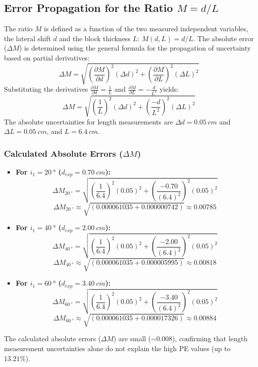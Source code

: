 \documentclass[12pt, a4paper]{article}
\begin{document}
\subsection{Error Propagation for the Ratio $M = d/L$}
The ratio $M$ is defined as a function of the two measured independent variables, the lateral shift $d$ and the block thickness $L$: $M(d,L) = d/L$. The absolute error ($\Delta M$) is determined using the general formula for the propagation of uncertainty based on partial derivatives:
$$\Delta M=\sqrt{\left(\frac{\partial M}{\partial d}\right)^{2}\left(\Delta d\right)^{2}+\left(\frac{\partial M}{\partial L}\right)^{2}\left(\Delta L\right)^{2}}$$
Substituting the derivatives $\frac{\partial M}{\partial d} = \frac{1}{L}$ and $\frac{\partial M}{\partial L} = -\frac{d}{L^{2}}$ yields:
$$\Delta M=\sqrt{\left(\frac{1}{L}\right)^{2}\left(\Delta d\right)^{2}+\left(\frac{-d}{L^{2}}\right)^{2}\left(\Delta L\right)^{2}}$$
The absolute uncertainties for length measurements are $\Delta d = \SI{0.05}{cm}$ and $\Delta L = \SI{0.05}{cm}$, and $L = \SI{6.4}{cm}$.

\subsubsection{Calculated Absolute Errors ($\Delta M$)}
\begin{itemize}
    \item \textbf{For $i_1 = \SI{20}{\degree}$ ($d_{exp} = \SI{0.70}{cm}$):}
    $$\Delta M_{\SI{20}{\degree}} = \sqrt{\left(\frac{1}{6.4}\right)^{2}\left(0.05\right)^{2}+\left(\frac{-0.70}{\left(6.4\right)^{2}}\right)^{2}\left(0.05\right)^{2}}$$
    $$\Delta M_{\SI{20}{\degree}} \approx \sqrt{(0.000061035 + 0.000000742)} \approx \mathbf{0.00785}$$
    
    \item \textbf{For $i_1 = \SI{40}{\degree}$ ($d_{exp} = \SI{2.00}{cm}$):}
    $$\Delta M_{\SI{40}{\degree}} = \sqrt{\left(\frac{1}{6.4}\right)^{2}\left(0.05\right)^{2}+\left(\frac{-2.00}{\left(6.4\right)^{2}}\right)^{2}\left(0.05\right)^{2}}$$
    $$\Delta M_{\SI{40}{\degree}} \approx \sqrt{(0.000061035 + 0.000005995)} \approx \mathbf{0.00818}$$

    \item \textbf{For $i_1 = \SI{60}{\degree}$ ($d_{exp} = \SI{3.40}{cm}$):}
    $$\Delta M_{\SI{60}{\degree}} = \sqrt{\left(\frac{1}{6.4}\right)^{2}\left(0.05\right)^{2}+\left(\frac{-3.40}{\left(6.4\right)^{2}}\right)^{2}\left(0.05\right)^{2}}$$
    $$\Delta M_{\SI{60}{\degree}} \approx \sqrt{(0.000061035 + 0.000017326)} \approx \mathbf{0.00884}$$
\end{itemize}
The calculated absolute errors ($\Delta M$) are small ($\sim 0.008$), confirming that length measurement uncertainties alone do not explain the high PE values (up to $13.21\%$).
\end{document}
